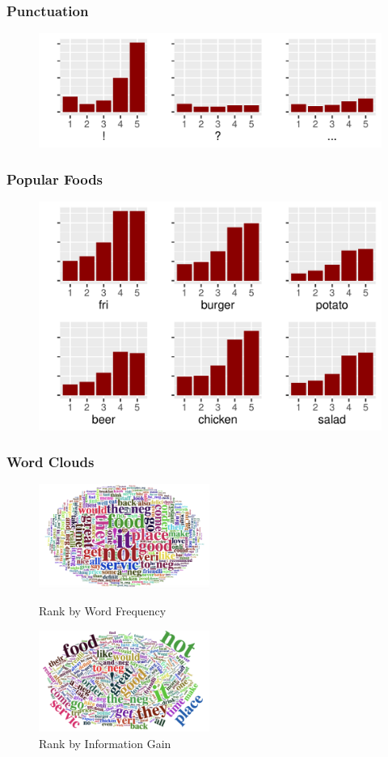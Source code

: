 \documentclass[notheorems, aspectratio=54]{beamer}
\begin{document}
\begin{frame}
\frametitle{Punctuation}
\begin{figure}[H]
	\centering
	\includegraphics[width=4.6in]{punctuation.pdf}
\end{figure}
\end{frame}

\begin{frame}
\frametitle{Popular Foods}
\begin{figure}[H]
	\centering
	\includegraphics[width=4.6in]{food.pdf}
\end{figure}
\end{frame}

\begin{frame}
\frametitle{Word Clouds}
\begin{figure}
	\begin{minipage}[t]{0.5\linewidth}
		\centering
		\includegraphics[width=2.2in]{all.jpg}
		\caption{Rank by Word Frequency}
		\label{fig:side:a}
	\end{minipage}%
	\begin{minipage}[t]{0.5\linewidth}
		\centering
		\includegraphics[width=2.2in]{info_gain.jpg}
		\caption{Rank by Information Gain}
		\label{fig:side:b}
	\end{minipage}
\end{figure}
\end{frame}
\end{document}
